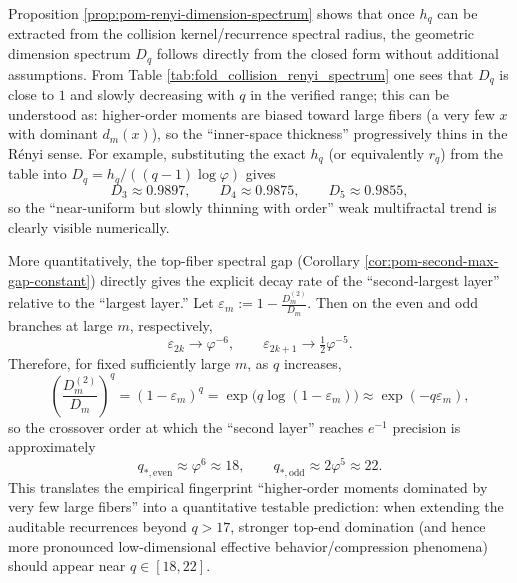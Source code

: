 \begin{remark}\label{rem:pom-renyi-dimension-values}
Proposition \ref{prop:pom-renyi-dimension-spectrum} shows that once \(h_q\) can be extracted from the collision kernel/recurrence spectral radius, the geometric dimension spectrum \(D_q\) follows directly from the closed form without additional assumptions.
From Table \ref{tab:fold_collision_renyi_spectrum} one sees that \(D_q\) is close to \(1\) and slowly decreasing with \(q\) in the verified range; this can be understood as: higher-order moments are biased toward large fibers (a very few \(x\) with dominant \(d_m(x)\)), so the ``inner-space thickness'' progressively thins in the R\'enyi sense.
For example, substituting the exact \(h_q\) (or equivalently \(r_q\)) from the table into
\(
D_q=h_q/((q-1)\log\varphi)
\)
gives
\[
D_3\approx 0.9897,\qquad D_4\approx 0.9875,\qquad D_5\approx 0.9855,
\]
so the ``near-uniform but slowly thinning with order'' weak multifractal trend is clearly visible numerically.
\par
More quantitatively, the top-fiber spectral gap (Corollary \ref{cor:pom-second-max-gap-constant}) directly gives the explicit decay rate of the ``second-largest layer'' relative to the ``largest layer.''
Let
\(
\varepsilon_m:=1-\frac{D_m^{(2)}}{D_m}
\).
Then on the even and odd branches at large \(m\), respectively,
\[
\varepsilon_{2k}\to \varphi^{-6},
\qquad
\varepsilon_{2k+1}\to \tfrac12\varphi^{-5}.
\]
Therefore, for fixed sufficiently large \(m\), as \(q\) increases,
\[
\left(\frac{D_m^{(2)}}{D_m}\right)^q
=(1-\varepsilon_m)^q
=\exp\!\bigl(q\log(1-\varepsilon_m)\bigr)
\approx \exp(-q\varepsilon_m),
\]
so the crossover order at which the ``second layer'' reaches \(e^{-1}\) precision is approximately
\[
q_{\ast,\mathrm{even}}\approx \varphi^{6}\approx 18,
\qquad
q_{\ast,\mathrm{odd}}\approx 2\varphi^{5}\approx 22.
\]
This translates the empirical fingerprint ``higher-order moments dominated by very few large fibers'' into a quantitative testable prediction: when extending the auditable recurrences beyond \(q>17\), stronger top-end domination (and hence more pronounced low-dimensional effective behavior/compression phenomena) should appear near \(q\in[18,22]\).
\end{remark}



